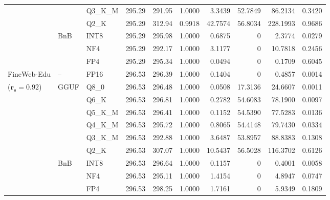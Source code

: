 \begin{table}[t]
{\begin{tabular}{ll l rrrrrrr}
 &  & Q3\_K\_M & 295.29 & 291.95 & 1.0000 & 3.3439 & 52.7849 & 86.2134 & 0.3420 \\
 &  & Q2\_K & 295.29 & 312.94 & 0.9918 & 42.7574 & 56.8034 & 228.1993 & 0.9686 \\
 & BnB & INT8 & 295.29 & 295.98 & 1.0000 & 0.6875 & \cellcolor{cyan!12} $0$ & 2.3774 & 0.0279 \\
 &  & NF4 & 295.29 & 292.17 & 1.0000 & 3.1177 & \cellcolor{cyan!12} $0$ & 10.7818 & 0.2456 \\
 &  & FP4 & 295.29 & 295.34 & 1.0000 & 0.0494 & \cellcolor{cyan!12} $0$ & 0.1709 & 0.6045 \\
\midrule
FineWeb-Edu & -- & FP16 & 296.53 & 296.39 & 1.0000 & 0.1404 & \cellcolor{cyan!12} $0$ & 0.4857 & 0.0014 \\
{\small ($\mathbf{r_s{=}0.92}$)} & GGUF & Q8\_0 & 296.53 & 296.48 & 1.0000 & 0.0508 & 17.3136 & 24.6607 & 0.0011 \\
 &  & Q6\_K & 296.53 & 296.81 & 1.0000 & 0.2782 & 54.6083 & 78.1900 & 0.0097 \\
 &  & Q5\_K\_M & 296.53 & 296.41 & 1.0000 & 0.1152 & 54.5390 & 77.5283 & 0.0136 \\
 &  & Q4\_K\_M & 296.53 & 295.72 & 1.0000 & 0.8065 & 54.4148 & 79.7430 & 0.0334 \\
 &  & Q3\_K\_M & 296.53 & 292.88 & 1.0000 & 3.6487 & 53.8957 & 88.8383 & 0.1308 \\
 &  & Q2\_K & 296.53 & 307.07 & 1.0000 & 10.5437 & 56.5028 & 116.3702 & 0.6126 \\
 & BnB & INT8 & 296.53 & 296.64 & 1.0000 & 0.1157 & \cellcolor{cyan!12} $0$ & 0.4001 & 0.0058 \\
 &  & NF4 & 296.53 & 295.11 & 1.0000 & 1.4154 & \cellcolor{cyan!12} $0$ & 4.8947 & 0.0747 \\
 &  & FP4 & 296.53 & 298.25 & 1.0000 & 1.7161 & \cellcolor{cyan!12} $0$ & 5.9349 & 0.1809 \\
\bottomrule
\end{tabular}}
\end{table}